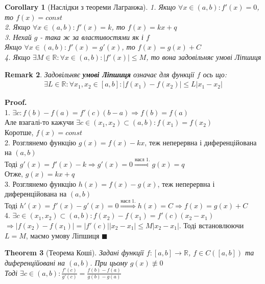 \documentclass[a4paper, 14pt]{extarticle}
\def\huge{\displaystyle}
\def\bigline{\vspace{5mm}\\}
\theoremstyle{theoremdd}
\newtheorem{theorem}{Theorem}[subsection]
\theoremstyle{theoremdd}
\theoremstyle{theoremdd}
\theoremstyle{theoremdd}
\theoremstyle{theoremdd}
\theoremstyle{theoremdd}
\newtheorem{remark}[theorem]{Remark}
\theoremstyle{theoremdd}
\theoremstyle{theoremdd}
\newtheorem{corollary}[theorem]{Corollary}
\newenvironment{pf}{\vspace*{-3mm} \textbf{Proof. \\}}{$\blacksquare$}
\begin{document}
\begin{corollary}[Наслідки з теореми Лагранжа]
1. Якщо $\forall x \in (a,b): f'(x) = 0$, то $f(x) = const$\\
2. Якщо $\forall x \in (a,b): f'(x) = k$, то $f(x) = kx + q$\\
3. Нехай $g$ - така ж за властивостями як і $f$ \\ Якщо $\forall x \in (a,b): f'(x) = g'(x)$, то $f(x) = g(x) + C$\\
4. Якщо $\exists M \in \mathbb{R}: \forall x \in (a,b): |f'(x)| \leq M$, то вона задовільняє умові Ліпшиця
\end{corollary}

\begin{remark}
Задовільняє \textbf{умові Ліпшиця} означає для функції $f$ ось що:
\begin{align*}
\exists L \in \mathbb{R}: \forall x_1,x_2 \in [a,b]: |f(x_1)-f(x_2)| \leq L|x_1-x_2|
\end{align*}
\end{remark}

\begin{pf}
1. $\exists c: f(b)-f(a) = f'(c)(b-a) \Rightarrow f(b) = f(a)$\\
Але взагалі-то кажучи $\exists c \in (x_1,x_2) \subset (a,b): f(x_1) = f(x_2)$\\
Коротше, $f(x) = const$\bigline
2. Розглянемо функцію $g(x) = f(x) - kx$, теж неперервна і диференційована на $(a,b)$\\
Тоді $g'(x) = f'(x) - k \Rightarrow g'(x) = 0 \overset{\textrm{насл 1.}}{\Rightarrow} g(x) = q$\\
Отже, $g(x) = kx + q$\bigline
3. Розглянемо функцію $h(x) = f(x) - g(x)$, теж неперервна і диференційована на $(a,b)$\\
Тоді $h'(x) = f'(x) - g'(x) = 0 \overset{\textrm{насл 1.}}{\Rightarrow} h(x) = C \Rightarrow f(x) = g(x) + C$\bigline
4. $\exists c \in (x_1,x_2) \subset (a,b): f(x_2)-f(x_1)=f'(c)(x_2-x_1)$\\
$\Rightarrow |f(x_2)-f(x_1)|=|f'(c)||x_2-x_1| \leq M|x_2-x_1|$. Тоді встановлюючи $L=M$, маємо умову Ліпшиця
\end{pf}

\begin{theorem}[Теорема Коші]
Задані функції $f: [a,b] \to \mathbb{R}$, $f \in C([a,b])$ та диференційовані на $(a,b)$. При цьому $g(x) \not\equiv 0$\\
Тоді $\exists c \in (a,b): \huge \frac{f'(c)}{g'(c)}  =  \frac{f(b)-f(a)}{g(b)-g(a)}$
\end{theorem}
\end{document}
